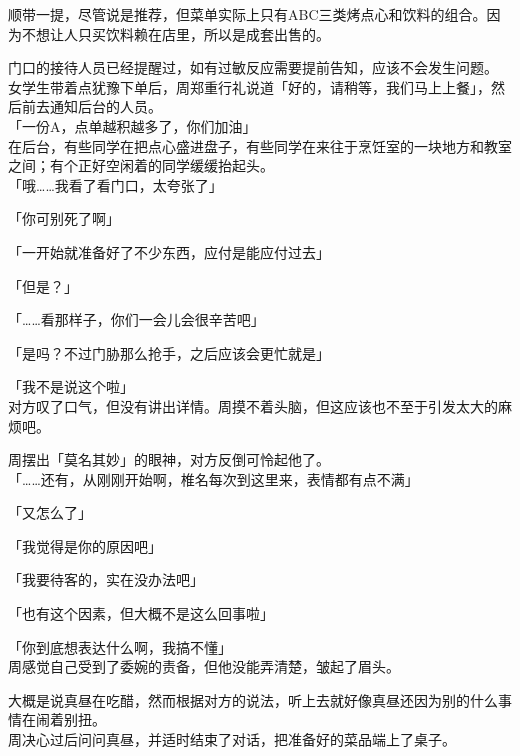 顺带一提，尽管说是推荐，但菜单实际上只有ABC三类烤点心和饮料的组合。因为不想让人只买饮料赖在店里，所以是成套出售的。

门口的接待人员已经提醒过，如有过敏反应需要提前告知，应该不会发生问题。\\

女学生带着点犹豫下单后，周郑重行礼说道「好的，请稍等，我们马上上餐」，然后前去通知后台的人员。\\

「一份A，点单越积越多了，你们加油」\\

在后台，有些同学在把点心盛进盘子，有些同学在来往于烹饪室的一块地方和教室之间；有个正好空闲着的同学缓缓抬起头。\\

「哦……我看了看门口，太夸张了」

「你可别死了啊」

「一开始就准备好了不少东西，应付是能应付过去」

「但是？」

「……看那样子，你们一会儿会很辛苦吧」

「是吗？不过门胁那么抢手，之后应该会更忙就是」

「我不是说这个啦」\\

对方叹了口气，但没有讲出详情。周摸不着头脑，但这应该也不至于引发太大的麻烦吧。

周摆出「莫名其妙」的眼神，对方反倒可怜起他了。\\

「……还有，从刚刚开始啊，椎名每次到这里来，表情都有点不满」

「又怎么了」

「我觉得是你的原因吧」

「我要待客的，实在没办法吧」

「也有这个因素，但大概不是这么回事啦」

「你到底想表达什么啊，我搞不懂」\\

周感觉自己受到了委婉的责备，但他没能弄清楚，皱起了眉头。

大概是说真昼在吃醋，然而根据对方的说法，听上去就好像真昼还因为别的什么事情在闹着别扭。\\

周决心过后问问真昼，并适时结束了对话，把准备好的菜品端上了桌子。

